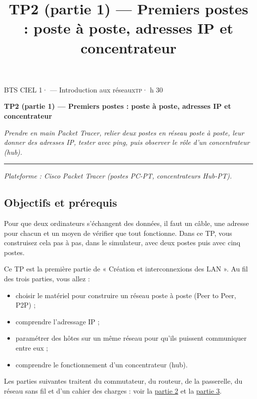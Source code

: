 \documentclass[
  french,
  10pt,
  a4paper,
]{scrartcl}
\title{TP2 (partie 1) --- Premiers postes : poste à poste, adresses IP
et concentrateur}
\author{}
\date{}
\providecommand{\tightlist}{%
  \setlength{\itemsep}{0pt}\setlength{\parskip}{0pt}}
\begin{document}
\thispagestyle{plain.scrheadings}
{\footnotesize\color{vertprofond}\textsc{BTS CIEL 1}\enspace·
--- Introduction aux réseaux\hfill \textsc{tp}\enspace· h
30\par}
\vspace{0.6ex}
{\LARGE\bfseries\color{vertprofond}TP2 (partie 1) --- Premiers postes :
poste à poste, adresses IP et concentrateur\par}
\vspace{0.5ex}
{\itshape Prendre en main Packet Tracer, relier deux postes en réseau
poste à poste, leur donner des adresses IP, tester avec ping, puis
observer le rôle d'un concentrateur (hub).\par}
\vspace{0.3ex}
{\color{vertprofond}\rule{\linewidth}{0.8pt}\par}
\vspace{0.8ex}


\emph{Plateforme : Cisco Packet Tracer (postes PC-PT, concentrateurs
Hub-PT).}

\subsection{Objectifs et prérequis}\label{objectifs-et-pruxe9requis}

Pour que deux ordinateurs s'échangent des données, il faut un câble, une
adresse pour chacun et un moyen de vérifier que tout fonctionne. Dans ce
TP, vous construisez cela pas à pas, dans le simulateur, avec deux
postes puis avec cinq postes.

Ce TP est la première partie de « Création et interconnexions des LAN ».
Au fil des trois parties, vous allez :

\begin{itemize}
\tightlist
\item
  choisir le matériel pour construire un réseau poste à poste (Peer to
  Peer, P2P) ;
\item
  comprendre l'adressage IP ;
\item
  paramétrer des hôtes sur un même réseau pour qu'ils puissent
  communiquer entre eux ;
\item
  comprendre le fonctionnement d'un concentrateur (hub).
\end{itemize}

Les parties suivantes traitent du commutateur, du routeur, de la
passerelle, du réseau sans fil et d'un cahier des charges : voir la
\href{../tp-creation-lan-2/index.qmd}{partie 2} et la
\href{../tp-creation-lan-3/index.qmd}{partie 3}.
\end{document}
